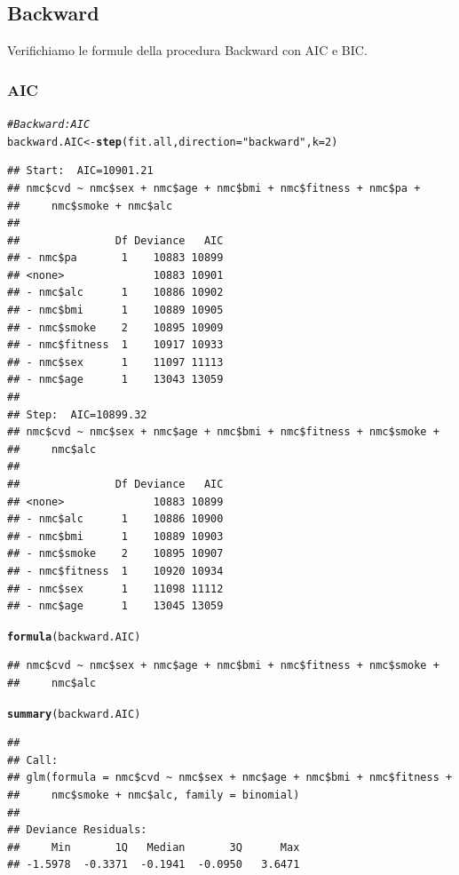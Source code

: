 \documentclass{article}\usepackage[]{graphicx}\usepackage[]{xcolor}
\makeatletter
\newcommand{\hlnum}[1]{\textcolor[rgb]{0.686,0.059,0.569}{#1}}%
\newcommand{\hlstr}[1]{\textcolor[rgb]{0.192,0.494,0.8}{#1}}%
\newcommand{\hlcom}[1]{\textcolor[rgb]{0.678,0.584,0.686}{\textit{#1}}}%
\newcommand{\hlstd}[1]{\textcolor[rgb]{0.345,0.345,0.345}{#1}}%
\newcommand{\hlkwb}[1]{\textcolor[rgb]{0.69,0.353,0.396}{#1}}%
\newcommand{\hlkwc}[1]{\textcolor[rgb]{0.333,0.667,0.333}{#1}}%
\newcommand{\hlkwd}[1]{\textcolor[rgb]{0.737,0.353,0.396}{\textbf{#1}}}%
\newenvironment{kframe}{%
 \def\at@end@of@kframe{}%
 \ifinner\ifhmode%
  \def\at@end@of@kframe{\end{minipage}}%
  \begin{minipage}{\columnwidth}%
 \fi\fi%
 \def\FrameCommand##1{\hskip\@totalleftmargin \hskip-\fboxsep
 \colorbox{shadecolor}{##1}\hskip-\fboxsep
     \hskip-\linewidth \hskip-\@totalleftmargin \hskip\columnwidth}%
 \MakeFramed {\advance\hsize-\width
   \@totalleftmargin\z@ \linewidth\hsize
   \@setminipage}}%
 {\par\unskip\endMakeFramed%
 \at@end@of@kframe}
\newenvironment{knitrout}{}{} %
\makeatother
\begin{document}
   \subsection{Backward}
      Verifichiamo le formule della procedura Backward con AIC e BIC.
        \subsubsection{AIC}
\begin{knitrout}
\color{fgcolor}\begin{kframe}
\begin{alltt}
\hlcom{#Backward: AIC}
\hlstd{backward.AIC} \hlkwb{<-} \hlkwd{step}\hlstd{(fit.all,} \hlkwc{direction}\hlstd{=}\hlstr{"backward"}\hlstd{,} \hlkwc{k}\hlstd{=}\hlnum{2}\hlstd{)}
\end{alltt}
\begin{verbatim}
## Start:  AIC=10901.21
## nmc$cvd ~ nmc$sex + nmc$age + nmc$bmi + nmc$fitness + nmc$pa + 
##     nmc$smoke + nmc$alc
## 
##               Df Deviance   AIC
## - nmc$pa       1    10883 10899
## <none>              10883 10901
## - nmc$alc      1    10886 10902
## - nmc$bmi      1    10889 10905
## - nmc$smoke    2    10895 10909
## - nmc$fitness  1    10917 10933
## - nmc$sex      1    11097 11113
## - nmc$age      1    13043 13059
## 
## Step:  AIC=10899.32
## nmc$cvd ~ nmc$sex + nmc$age + nmc$bmi + nmc$fitness + nmc$smoke + 
##     nmc$alc
## 
##               Df Deviance   AIC
## <none>              10883 10899
## - nmc$alc      1    10886 10900
## - nmc$bmi      1    10889 10903
## - nmc$smoke    2    10895 10907
## - nmc$fitness  1    10920 10934
## - nmc$sex      1    11098 11112
## - nmc$age      1    13045 13059
\end{verbatim}
\begin{alltt}
\hlkwd{formula}\hlstd{(backward.AIC)}
\end{alltt}
\begin{verbatim}
## nmc$cvd ~ nmc$sex + nmc$age + nmc$bmi + nmc$fitness + nmc$smoke + 
##     nmc$alc
\end{verbatim}
\begin{alltt}
\hlkwd{summary}\hlstd{(backward.AIC)}
\end{alltt}
\begin{verbatim}
## 
## Call:
## glm(formula = nmc$cvd ~ nmc$sex + nmc$age + nmc$bmi + nmc$fitness + 
##     nmc$smoke + nmc$alc, family = binomial)
## 
## Deviance Residuals: 
##     Min       1Q   Median       3Q      Max  
## -1.5978  -0.3371  -0.1941  -0.0950   3.6471  

\end{verbatim}
\end{kframe}
\end{knitrout}
\end{document}
